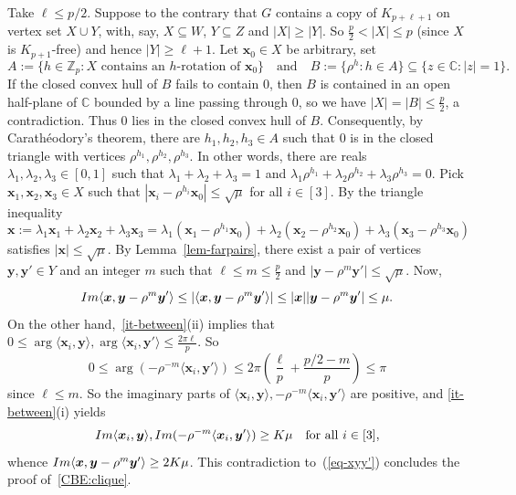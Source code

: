 \documentclass[11pt, a4paper]{article}
\newcommand\innerp[1]{\langle #1 \rangle}
\newcommand{\V}[1]{\mathbold{#1}}
\theoremstyle{definition}
\newcommand{\iminnerp}[1]{{\rm{Im}}\langle #1 \rangle}
\newcommand{\im}[1]{{\rm{Im}}(#1)}
\begin{document}
Take $\ell\le p/2$. Suppose to the contrary that $G$ contains a copy of $K_{p+\ell+1}$ on vertex set $X\cup Y$, with, say, $X\subseteq W$, $Y\subseteq Z$ and $|X|\ge |Y|$.
So $\frac{p}{2} < |X| \leq p$ (since $X$ is $K_{p+1}$-free) and hence $|Y| \geq \ell+1$.
Let $\V{x}_0 \in X$ be arbitrary, set
$$
A := \{h \in \mathbb{Z}_p: X \text{ contains an } h\text{-rotation of }\V{x}_0\}\quad\text{and}\quad B := \{\rho^h: h \in A\} \subseteq \{z \in \mathbb{C} : |z|=1\}.
$$
If the closed convex hull of $B$ fails to contain $0$, then $B$ is contained in an open half-plane of $\mathbb{C}$ bounded by a line passing through $0$, so we have $|X|=|B| \leq \frac{p}{2}$, a contradiction.
Thus $0$ lies in the closed convex hull of $B$. Consequently, by Carath\'eodory's theorem, there are $h_1,h_2,h_3 \in A$ such that $0$ is in the closed triangle with vertices $\rho^{h_1},\rho^{h_2},\rho^{h_3}$.
In other words, there are reals $\lambda_1,\lambda_2,\lambda_3 \in [0,1]$ such that $\lambda_1+\lambda_2+\lambda_3 =1$ and $\lambda_1\rho^{h_1}+\lambda_2\rho^{h_2}+\lambda_3\rho^{h_3}=0$.
Pick $\V{x}_1,\V{x}_2,\V{x}_3 \in X$ such that $|\V{x}_i-\rho^{h_i}\V{x}_0| \leq \sqrt{\mu}$ for all $i \in [3]$.
By the triangle inequality
$$
\V{x} := \lambda_1\V{x}_1+\lambda_2\V{x}_2+\lambda_3\V{x}_3 = \lambda_1(\V{x}_1-\rho^{h_1}\V{x}_0)+\lambda_2(\V{x}_2-\rho^{h_2}\V{x}_0)+\lambda_3(\V{x}_3-\rho^{h_3}\V{x}_0) 
$$
satisfies $|\V{x}| \leq \sqrt{\mu}$.
By Lemma~\ref{lem-farpairs}, there exist a pair of vertices $\V{y},\V{y}' \in Y$ and an integer $m$ such that $\ell \leq m \leq \frac{p}{2}$ and $|\V{y}-\rho^m\V{y}'| \leq \sqrt{\mu}$. Now,
\begin{equation}\label{eq-xyy'}
\iminnerp{\V{x},\V{y}-\rho^m\V{y}'} \leq |\innerp{\V{x},\V{y}-\rho^m\V{y}'}| \leq |\V{x}||\V{y}-\rho^m\V{y}'| \leq \mu.
\end{equation}
 On the other hand,~\ref{it-between}(ii) implies that $0 \leq \arg\innerp{\V{x}_i,\V{y}}, \arg\innerp{\V{x}_i,\V{y}'} \leq \frac{2\pi\ell}{p}$. So
 $$
 0 \leq \arg(-\rho^{-m}\innerp{\V{x}_i,\V{y}'}) \leq 2\pi\left(\frac{\ell}{p}+\frac{p/2-m}{p}\right) \leq \pi
 $$
 since $\ell \leq m$.
 So the imaginary parts of $\innerp{\V{x}_i,\V{y}},-\rho^{-m}\innerp{\V{x}_i,\V{y}'}$ are positive, and
 \ref{it-between}(i) yields
$$
\iminnerp{\V{x}_i,\V{y}}, \im{-\rho^{-m}\innerp{\V{x}_i,\V{y}'}} \geq K\mu\quad\text{for all }i \in [3], 
$$
whence $\iminnerp{\V{x},\V{y}-\rho^m\V{y}'} \geq 2K\mu$.
This contradiction to~(\ref{eq-xyy'}) concludes the proof of~\ref{CBE:clique}.
\end{document}
